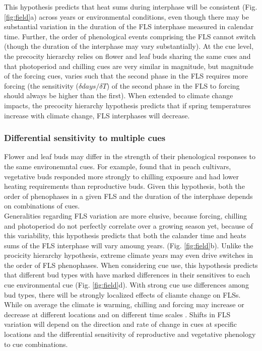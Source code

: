 \documentclass[11pt]{article}
\begin{document}
\noindent This hypothesis predicts that heat sums during interphase will be consistent (Fig. \ref{fig:field}a) across years or environmental conditions, even though there may be substantial variation in the duration of the FLS interphase measured in calendar time. Further, the order of phenological events comprising the FLS cannot switch (though the duration of the interphase may vary substantially). At the cue level, the precocity hierarchy relies on flower and leaf buds sharing the same cues and that photoperiod and chilling cues are very similar in magnitude, but magnitude of the forcing cues, varies such that the second phase in the FLS requires more forcing (the sensitivity ($\delta days/\delta T$) of the second phase in the FLS to forcing should always be higher than the first). When extended to climate change impacts, the precocity hierarchy hypothesis predicts that if spring temperatures increase with climate change, FLS interphases will decrease.

\subsubsection*{Differential sensitivity to multiple cues}
 \noindent Flower and leaf buds may differ in the strength of their phenological responses to the same environemntal cues. For example, \citet{Garigalio2016} found that in peach cultivars, vegetative buds responded more strongly to chilling exposure and had lower heating requirements than reproductive buds. Given this hypothesis, both the order of phenophases in a given FLS and the duration of the interphase depends on combinations of cues.\\
 
 Generalities regarding FLS variation are more elusive, because forcing, chilling and photoperiod do not perfectly correlate over a growing season yet, because of this variability, this hypothesis predicts that both the calander time and heats sums of the FLS interphase will vary amoung years. (Fig. \ref{fig:field}b). Unlike the procicity hierarchy hypothesis, extreme climate years may even drive switches in the order of FLS phenophases. When considering cue use, this hypothesis predicts that different bud types with have marked differences in their sensitives to each cue environmental cue (Fig. \ref{fig:field}d). With strong cue use differences among bud types, there will be strongly localized effects of cliamte change on FLSs. While on average the climate is warming, chilling and forcing may increase or decrease at different locations and on different time scales \citep{Ettinger}. Shifts in FLS variation will depend on the direction and rate of change in cues at specific locations and the differential sensitivity of reproductive and vegetative phenology to cue combinations.\\
\end{document}

